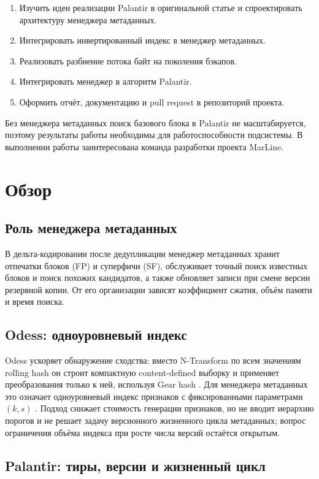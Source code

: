 \documentclass[a4paper]{article}
\begin{document}
\begin{enumerate}
    \item Изучить идеи реализации Palantir в оригинальной статье и спроектировать
          архитектуру менеджера метаданных.
    \item Интегрировать инвертированный индекс в менеджер метаданных.
    \item Реализовать разбиение потока байт на поколения бэкапов.
    \item Интегрировать менеджер в алгоритм Palantir.
    \item Оформить отчёт, документацию и pull request в репозиторий проекта.
\end{enumerate}

Без менеджера метаданных поиск базового блока в Palantir не масштабируется,
поэтому результаты работы необходимы для работоспособности подсистемы.
В выполнении работы заинтересована команда разработки проекта MarLine.
\section{Обзор}

\subsection{Роль менеджера метаданных}

В дельта-кодировании после дедупликации менеджер метаданных хранит отпечатки
блоков (FP) и суперфичи (SF), обслуживает точный поиск известных блоков и поиск
похожих кандидатов, а также обновляет записи при смене версии резервной копии.
От его организации зависят коэффициент сжатия, объём памяти и время поиска.

\subsection{Odess: одноуровневый индекс}

Odess ускоряет обнаружение сходства: вместо N-Transform по всем значениям
rolling hash он строит компактную content-defined выборку и применяет
преобразования только к ней, используя Gear hash \cite{odess}. Для менеджера
метаданных это означает одноуровневый индекс признаков с фиксированными
параметрами $(k, s)$ \cite{odess}. Подход снижает стоимость генерации признаков,
но не вводит иерархию порогов и не решает задачу версионного жизненного цикла
метаданных; вопрос ограничения объёма индекса при росте числа версий остаётся
открытым.

\subsection{Palantir: тиры, версии и жизненный цикл}
\end{document}
